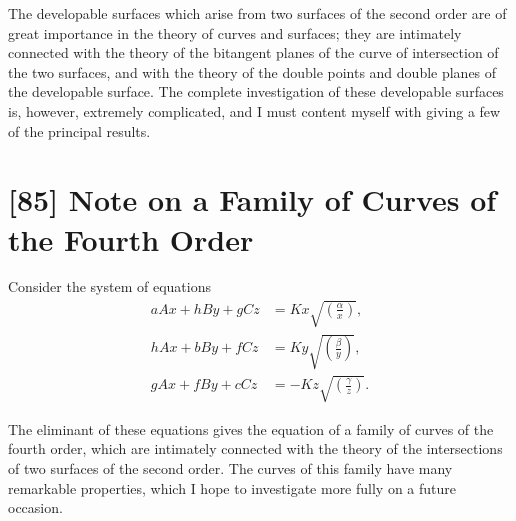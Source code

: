 \documentclass[12pt,a4paper]{article}
\begin{document}
The developable surfaces which arise from two surfaces of the second order are of great importance in the theory of curves and surfaces; they are intimately connected with the theory of the bitangent planes of the curve of intersection of the two surfaces, and with the theory of the double points and double planes of the developable surface. The complete investigation of these developable surfaces is, however, extremely complicated, and I must content myself with giving a few of the principal results.

\newpage
\section*{[85] Note on a Family of Curves of the Fourth Order}

\bigskip

Consider the system of equations
\begin{align*}
aAx + hBy + gCz &= Kx\sqrt{\left(\frac{\alpha}{x}\right)}, \\
hAx + bBy + fCz &= Ky\sqrt{\left(\frac{\beta}{y}\right)}, \\
gAx + fBy + cCz &= -Kz\sqrt{\left(\frac{\gamma}{z}\right)}.
\end{align*}

The eliminant of these equations gives the equation of a family of curves of the fourth order, which are intimately connected with the theory of the intersections of two surfaces of the second order. The curves of this family have many remarkable properties, which I hope to investigate more fully on a future occasion.
\end{document}
